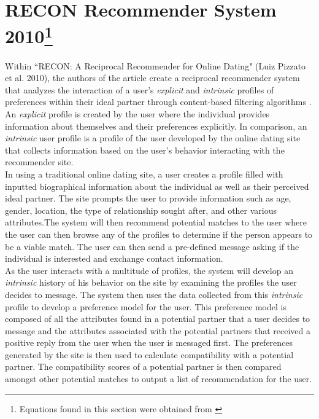 \documentclass[11pt]{article}
\begin{document}
\section{RECON Recommender System 2010\footnote{Equations found in this section were obtained from \cite{RECON}}}
 Within ``RECON: A Reciprocal Recommender for Online Dating" (Luiz Pizzato et al. 2010), the authors of the article create a reciprocal recommender system that analyzes the interaction of a user's \textit{explicit}  and \textit{intrinsic} profiles of preferences within their ideal partner through content-based filtering algorithms \cite{RECON}. An \textit{explicit} profile is created by the user  where the individual provides information about themselves and their preferences explicitly. In comparison, an \textit{intrinsic} user profile is a profile of the user developed by the online dating site that collects information based on the user's behavior interacting with the recommender site. \\
 \indent In using a traditional online dating site, a user creates a profile filled with inputted biographical information about the individual as well as their perceived ideal partner. The site prompts the user to provide information such as age, gender, location, the type of relationship sought after, and other various attributes.The system will then recommend potential matches to the user where the user can then browse any of the profiles to determine if the person appears to be a viable match. The user can then send a pre-defined message asking if the individual is interested and exchange contact information.\\ 
 \indent As the user interacts with a multitude of profiles, the system will develop an \textit{intrinsic} history of his behavior on the site by examining the profiles the user decides to message. The system then uses the data collected from this \textit{intrinsic} profile to develop a preference model for the user. This preference model is composed of all the attributes found in a potential partner that a user decides to message and the attributes associated with the potential partners that received a positive reply from the user when the user is messaged first. The preferences generated by the site is then used to calculate compatibility with a potential partner. The compatibility scores of a potential partner is then compared amongst other potential matches to output a list of recommendation for the user.
 
\end{document}
